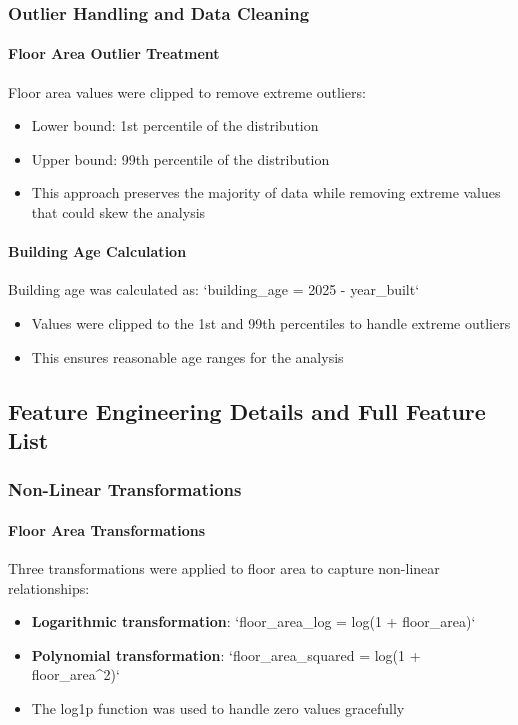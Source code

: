 \subsubsection{Outlier Handling and Data Cleaning}

\paragraph{Floor Area Outlier Treatment}
Floor area values were clipped to remove extreme outliers:
\begin{itemize}
    \item Lower bound: 1st percentile of the distribution
    \item Upper bound: 99th percentile of the distribution
    \item This approach preserves the majority of data while removing extreme values that could skew the analysis
\end{itemize}

\paragraph{Building Age Calculation}
Building age was calculated as: `building\_age = 2025 - year\_built`
\begin{itemize}
    \item Values were clipped to the 1st and 99th percentiles to handle extreme outliers
    \item This ensures reasonable age ranges for the analysis
\end{itemize}

\subsection{Feature Engineering Details and Full Feature List}

\subsubsection{Non-Linear Transformations}

\paragraph{Floor Area Transformations}
Three transformations were applied to floor area to capture non-linear relationships:
\begin{itemize}
    \item \textbf{Logarithmic transformation}: `floor\_area\_log = log(1 + floor\_area)`
    \item \textbf{Polynomial transformation}: `floor\_area\_squared = log(1 + floor\_area^2)`
    \item The log1p function was used to handle zero values gracefully
\end{itemize}

